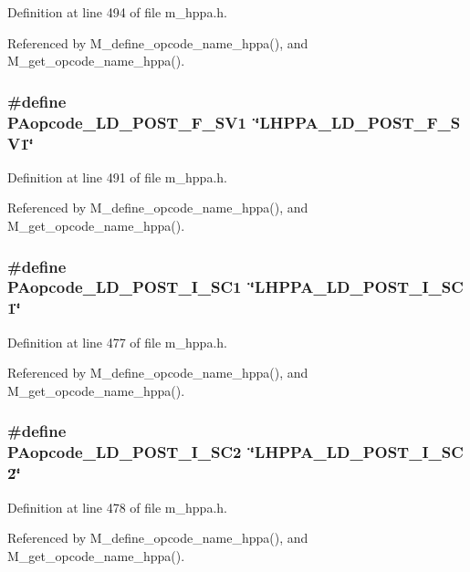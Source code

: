 Definition at line 494 of file m\_\-hppa.h.

Referenced by M\_\-define\_\-opcode\_\-name\_\-hppa(), and M\_\-get\_\-opcode\_\-name\_\-hppa().
\subsubsection{\setlength{\rightskip}{0pt plus 5cm}\#define PAopcode\_\-LD\_\-POST\_\-F\_\-SV1~\char`\"{}LHPPA\_\-LD\_\-POST\_\-F\_\-SV1\char`\"{}}\label{m__hppa_8h_523921bbb95ba3a1f9677f8d1248aca2}




Definition at line 491 of file m\_\-hppa.h.

Referenced by M\_\-define\_\-opcode\_\-name\_\-hppa(), and M\_\-get\_\-opcode\_\-name\_\-hppa().
\subsubsection{\setlength{\rightskip}{0pt plus 5cm}\#define PAopcode\_\-LD\_\-POST\_\-I\_\-SC1~\char`\"{}LHPPA\_\-LD\_\-POST\_\-I\_\-SC1\char`\"{}}\label{m__hppa_8h_d7a8ca93365337b7a8a72b24ecb380a7}




Definition at line 477 of file m\_\-hppa.h.

Referenced by M\_\-define\_\-opcode\_\-name\_\-hppa(), and M\_\-get\_\-opcode\_\-name\_\-hppa().
\subsubsection{\setlength{\rightskip}{0pt plus 5cm}\#define PAopcode\_\-LD\_\-POST\_\-I\_\-SC2~\char`\"{}LHPPA\_\-LD\_\-POST\_\-I\_\-SC2\char`\"{}}\label{m__hppa_8h_0719019a4ac3752c3e45b76898d06069}




Definition at line 478 of file m\_\-hppa.h.

Referenced by M\_\-define\_\-opcode\_\-name\_\-hppa(), and M\_\-get\_\-opcode\_\-name\_\-hppa().
